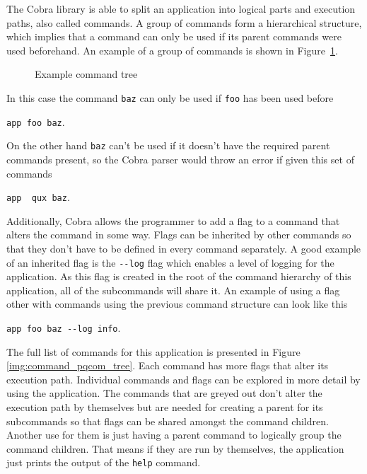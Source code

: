 The Cobra library is able to split an application into logical parts and execution paths, also called commands. A group of commands form a hierarchical structure, which implies that a command can only be used if its parent commands were used beforehand. An example of a group of commands is shown in Figure~\ref{img:example_tree}.
\begin{figure}[h]
  \begin{center}
    \begin{minipage}[t]{0.2\linewidth}
    \end{minipage}
  \end{center}
  \caption{Example command tree}
  \label{img:example_tree}
\end{figure}

\noindent In this case the command \texttt{baz} can only be used if \texttt{foo} has been used before
\begin{center}
  \texttt{app foo baz}.
\end{center}
On the other hand \texttt{baz} can't be used if it doesn't have the required parent commands present, so the Cobra parser would throw an error if given this set of commands
\begin{center}
  \texttt{app {\color{red} qux} baz}.
\end{center}

Additionally, Cobra allows the programmer to add a flag to a command that alters the command in some way. Flags can be inherited by other commands so that they don't have to be defined in every command separately. A good example of an inherited flag is the \texttt{-\--log} flag which enables a level of logging for the application. As this flag is created in the root of the command hierarchy of this application, all of the subcommands will share it. An example of using a flag other with commands using the previous command structure can look like this
\begin{center}
  \texttt{app foo baz -\--log info}.
\end{center}

The full list of commands for this application is presented in Figure \ref{img:command_pqcom_tree}. Each command has more flags that alter its execution path. Individual commands and flags can be explored in more detail by using the application. The commands that are greyed out don't alter the execution path by themselves but are needed for creating a parent for its subcommands so that flags can be shared amongst the command children. Another use for them is just having a parent command to logically group the command children. That means if they are run by themselves, the application just prints the output of the \texttt{help} command.

